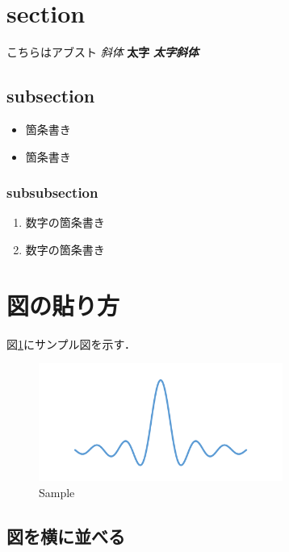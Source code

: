 \section{section}\label{section}

こちらはアブスト \emph{斜体} \textbf{太字} \textbf{\emph{太字斜体}}

\subsection{subsection}\label{subsection}

\begin{itemize}
\tightlist
\item
  箇条書き
\item
  箇条書き
\end{itemize}

\subsubsection{subsubsection}\label{subsubsection}

\begin{enumerate}
\def\labelenumi{\arabic{enumi}.}
\tightlist
\item
  数字の箇条書き
\item
  数字の箇条書き
\end{enumerate}

\section{図の貼り方}\label{ux56f3ux306eux8cbcux308aux65b9}

図\ref{fig:sample}にサンプル図を示す．

\begin{figure}[ht]
\centering
\includegraphics[width=8.00000cm]{./fig/sample.png}
\caption{Sample\label{fig:sample}}
\end{figure}

\subsection{図を横に並べる}\label{ux56f3ux3092ux6a2aux306bux4e26ux3079ux308b}


